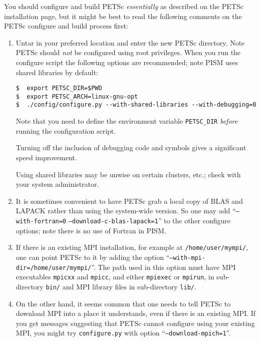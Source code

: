 \documentclass[titlepage,letterpaper,final]{scrartcl}
\begin{document}
You should configure and build PETSc \emph{essentially} as described on the
PETSc installation page, but it might be best to read the following comments on
the PETSc configure and build process first:

\renewcommand{\labelenumi}{(\roman{enumi})}
\begin{enumerate}
\item Untar in your preferred location and enter the new PETSc directory.
  Note PETSc should \emph{not} be configured using root privileges.
  When you run the configure script the following
  options are recommended; note PISM uses shared libraries by
  default:
\begin{verbatim}
$  export PETSC_DIR=$PWD
$  export PETSC_ARCH=linux-gnu-opt
$  ./config/configure.py --with-shared-libraries --with-debugging=0
\end{verbatim}

Note that you need to define the environment variable
\texttt{PETSC_DIR} \emph{before} running the configuration
script.

Turning off the inclusion of debugging code and symbols gives a significant speed improvement.

Using shared libraries may be unwise on certain clusters, etc.; check with your system administrator.

\item It is sometimes convenient to have PETSc grab a local copy of BLAS and LAPACK rather than using the system-wide version.  So one may add ``\texttt{--with-fortran=0} \texttt{--download-c-blas-lapack=1}'' to the other configure options; note there is no use of Fortran in PISM.

\item If there is an existing MPI installation, for example at \texttt{/home/user/mympi/}, one can point PETSc to it by adding the option ``\texttt{--with-mpi-dir=/home/user/mympi/}''.  The path used in this option must have MPI executables \texttt{mpicxx} and \texttt{mpicc}, and either \texttt{mpiexec} or \texttt{mpirun}, in sub-directory \texttt{bin/} and MPI library files in sub-directory \texttt{lib/}.

\item On the other hand, it seems common that one needs to tell PETSc to download MPI into a place it understands, even if there is an existing MPI.  If you get messages suggesting that PETSc cannot configure using your existing MPI, you might try \texttt{configure.py} with option ``\texttt{--download-mpich=1}''.


\end{enumerate}
\end{document}
